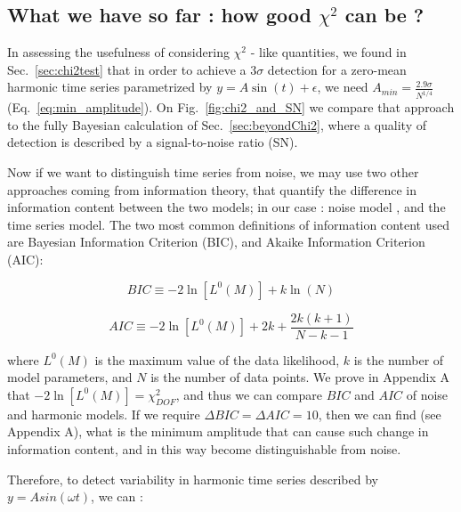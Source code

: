 \documentclass[fleqn,usenatbib]{mnras}  %
\begin{document}
%
%

\subsection{What we have so far : how good $\chi^{2}$ can be ? }

In assessing the usefulness of  considering $\chi^{2}$  - like quantities, we found in Sec.~\ref{sec:chi2test}  that in order to achieve a $3 \sigma$ detection for a zero-mean harmonic time series  parametrized by $y = A \sin(t) + \epsilon $,  we need $A_{min} = \frac{2.9 \sigma}{N^{1/4}}$ (Eq.~\ref{eq:min_amplitude}).  On Fig.~\ref{fig:chi2_and_SN} we compare that approach to the fully Bayesian calculation of Sec.~\ref{sec:beyondChi2}, where a quality of detection is described by a signal-to-noise ratio (SN). 

Now if we want to distinguish time series from noise, we may use two other approaches coming from information theory, that quantify the difference in information content between the two models; in our case : noise model , and the time series model.  The two most common definitions of information content used are  Bayesian Information Criterion  (BIC), and Akaike Information Criterion (AIC):

\begin{equation}
\label{eq:BIC}
BIC \equiv -2 \ln [L^{0}(M)] + k \ln(N)
\end{equation}

\begin{equation}
\label{eq:AIC}
AIC \equiv -2 \ln[L^{0}(M)] + 2k + \frac{2k(k+1)}{N-k-1}
\end{equation}

where $L^{0}(M)$ is the maximum value of the data likelihood, $k$ is the number of model parameters, and $N$ is the number of data points. We prove in Appendix A that $-2 \ln[L^{0}(M)] = \chi^{2}_{DOF}$, and thus we can compare $BIC$ and $AIC$ of noise and harmonic models. If we require $\Delta BIC = \Delta AIC = 10$, then we can find (see Appendix A), what is the minimum amplitude that can cause such change in information content, and in this way become distinguishable from noise. 

Therefore, to detect variability in harmonic time series described by $y = A sin(\omega t)$, we can : 
\end{document}

